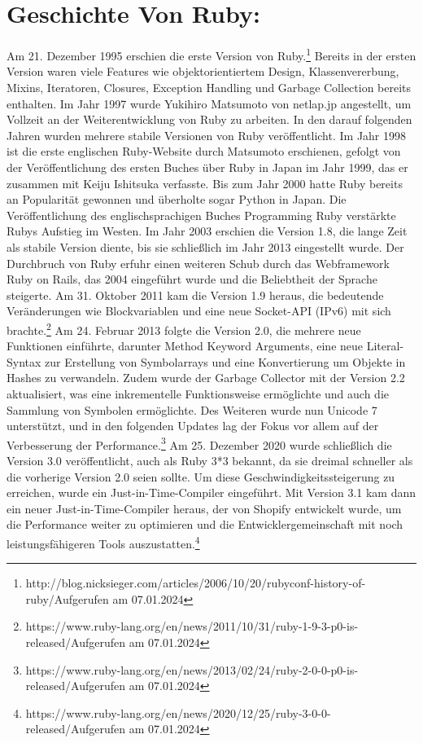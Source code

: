 \documentclass{article}
\begin{document}
\section*{Geschichte Von Ruby:}
Am 21. Dezember 1995 erschien die erste Version von Ruby.\footnote{http://blog.nicksieger.com/articles/2006/10/20/rubyconf-history-of-ruby/\label{rubyh}Aufgerufen am 07.01.2024} Bereits in der ersten Version waren viele Features wie objektorientiertem Design, Klassenvererbung, Mixins, Iteratoren, Closures, Exception Handling und Garbage Collection bereits enthalten. Im Jahr 1997 wurde Yukihiro Matsumoto von netlap.jp angestellt, um Vollzeit an der Weiterentwicklung von Ruby zu arbeiten. In den darauf folgenden Jahren wurden mehrere stabile Versionen von Ruby veröffentlicht.
Im Jahr 1998 ist die erste englischen Ruby-Website durch Matsumoto erschienen, gefolgt von der Veröffentlichung des ersten Buches über Ruby in Japan im Jahr 1999, das er zusammen mit Keiju Ishitsuka verfasste. Bis zum Jahr 2000 hatte Ruby bereits an Popularität gewonnen und überholte sogar Python in Japan. Die Veröffentlichung des englischsprachigen Buches \grqq Programming Ruby\grqq{} verstärkte Rubys Aufstieg im Westen.
Im Jahr 2003 erschien die Version 1.8, die lange Zeit als stabile Version diente, bis sie schließlich im Jahr 2013 eingestellt wurde. Der Durchbruch von Ruby erfuhr einen weiteren Schub durch das Webframework Ruby on Rails, das 2004 eingeführt wurde und die Beliebtheit der Sprache steigerte.
Am 31. Oktober 2011 kam die Version 1.9 heraus, die bedeutende Veränderungen wie Blockvariablen und eine neue Socket-API (IPv6) mit sich brachte.\footnote{https://www.ruby-lang.org/en/news/2011/10/31/ruby-1-9-3-p0-is-released/Aufgerufen am 07.01.2024} Am 24. Februar 2013 folgte die Version 2.0, die mehrere neue Funktionen einführte, darunter Method Keyword Arguments, eine neue Literal-Syntax zur Erstellung von Symbolarrays und eine Konvertierung um Objekte in Hashes zu verwandeln. Zudem wurde der Garbage Collector mit der Version 2.2 aktualisiert, was eine inkrementelle Funktionsweise ermöglichte und auch die Sammlung von Symbolen ermöglichte. Des Weiteren wurde nun Unicode 7 unterstützt, und in den folgenden Updates lag der Fokus vor allem auf der Verbesserung der Performance.\footnote{https://www.ruby-lang.org/en/news/2013/02/24/ruby-2-0-0-p0-is-released/Aufgerufen am 07.01.2024}
Am 25. Dezember 2020 wurde schließlich die Version 3.0 veröffentlicht, auch als Ruby 3*3 bekannt, da sie dreimal schneller als die vorherige Version 2.0 seien sollte. Um diese Geschwindigkeitssteigerung zu erreichen, wurde ein Just-in-Time-Compiler eingeführt. Mit Version 3.1 kam dann ein neuer Just-in-Time-Compiler heraus, der von Shopify entwickelt wurde, um die Performance weiter zu optimieren und die Entwicklergemeinschaft mit noch leistungsfähigeren Tools auszustatten.\footnote{https://www.ruby-lang.org/en/news/2020/12/25/ruby-3-0-0-released/Aufgerufen am 07.01.2024}
\end{document}
